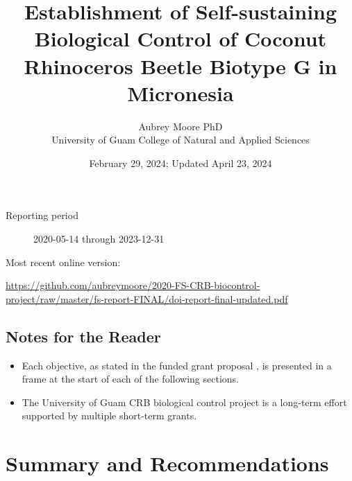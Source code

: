 \documentclass[12pt,letterpaper,english,bibliography=totocnumbered, abstract=on]{scrartcl}
\begin{document}
\titlehead{Final Report: DOI-OIA-D20AP00060}

\title{Establishment of Self-sustaining Biological Control of Coconut Rhinoceros Beetle Biotype G in Micronesia}

\author{Aubrey Moore PhD\\University of Guam College of Natural and Applied Sciences}

\date{February 29, 2024; Updated April 23, 2024}

\maketitle

\begin{description}
	\item[Reporting period] 2020-05-14 through 2023-12-31
\end{description}

Most recent online version: \\
\begin{footnotesize}	
	\url{https://github.com/aubreymoore/2020-FS-CRB-biocontrol-project/raw/master/fs-report-FINAL/doi-report-final-updated.pdf}
\end{footnotesize}

\clearpage

\tableofcontents

\clearpage


\newpage

\subsection*{Notes for the Reader}

\begin{itemize}

\item Each objective, as stated in the funded grant proposal \cite{mooreGrantProposalDOIOIA2020}, is presented in a frame at the start of each of the following sections. 

\item The University of Guam CRB biological control project is a long-term effort supported by multiple short-term grants.  

\end{itemize}

\clearpage

\section{Summary and Recommendations}
\end{document}
